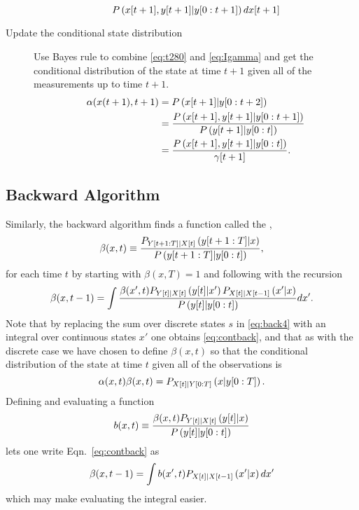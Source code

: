 \begin{description}
\begin{equation}
  P\left({x}{[t+1]},{y}{[t+1]}|y[0:t+1] \right) d{x}{[t+1]} \\
\end{equation}
\item[Update the conditional state distribution]  Use
  Bayes rule to combine \eqref{eq:t280} and \eqref{eq:Igamma} and get
  the conditional distribution of the state at time $t+1$ given all of
  the measurements up to time $t+1$.
\begin{align}
  \alpha(x(t+1),t+1) &= P\left({x}{[t+1]}|y[0:t+2] \right) \\
  &=  \frac{ P\left({x}{[t+1]},{y}{[t+1]}|y[0:t+1]
    \right)}{P\left({y}{[t+1]}|y[0:t] \right)}\\
  \label{eq:IUpdate}
  &= \frac{ P\left({x}{[t+1]},{y}{[t+1]}|y[0:t]
    \right)}{{\gamma}{[t+1]}}.
\end{align}
\end{description}

\subsection{Backward Algorithm}

Similarly, the backward algorithm finds a function called the
,
\begin{equation}
  \label{eq:contbeta}
  \beta(x,t) \equiv \frac{P_{Y[t+1:T]|{X}{[t]}}
  \left(y[t+1:T]|x \right)}{P\left(y[t+1:T]|y[0:t]
               \right)},
\end{equation}
for each time $t$ by starting with $\beta(x,T) = 1$ and following with
the recursion
\begin{equation}
  \label{eq:contback}
  \beta(x,t-1) = \int 
  \frac{\beta(x',t) P_{{Y}{[t]}|{X}{[t]}}\left({y}{[t]}|x' \right)
  P_{{X}{[t]}|{X}{[t-1]}}\left(x'|x \right)}
  {P\left({y}{[t]}|y[0:t] \right)} dx'.
\end{equation}
Note that by replacing the sum over discrete states $s$ in
\eqref{eq:back4} with an integral over continuous states $x'$ one
obtains \eqref{eq:contback}, and that as with the discrete case we
have chosen to define $\beta(x,t)$ so that the conditional
distribution of the state at time $t$ given all of the observations is
\begin{equation}
  \label{eq:contalphabeta}
  \alpha(x,t) \beta(x,t) = P_{{X}{[t]}|Y[0:T]}
  \left(x|y[0:T] \right).
\end{equation}
Defining and evaluating a \emph{} function
\begin{equation}
  \label{eq:bdef}
  b(x,t) \equiv \frac{\beta(x,t)
    P_{{Y}{[t]}|{X}{[t]}}\left({y}{[t]}|x
    \right)} {P\left({y}{[t]}|y[0:t] \right)}
\end{equation}
lets one write Eqn.~\eqref{eq:contback} as
\begin{equation*}
  \beta(x,t-1) = \int b(x',t) P_{{X}{[t]}|{X}{[t-1]}}\left(x'|x
  \right) dx'
\end{equation*}
which may make evaluating the integral easier.

